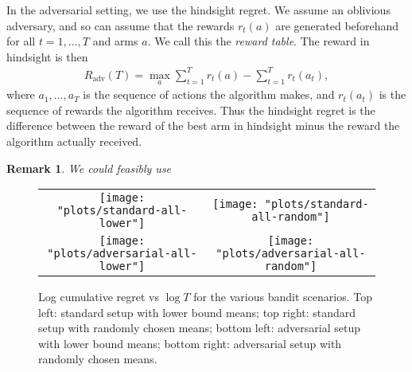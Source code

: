 \documentclass[10pt]{article}
\newtheorem{remark}{Remark}
\DeclareMathOperator{\adv}{adv}
\begin{document}
In the adversarial setting, we use the hindsight regret. We assume an oblivious
adversary, and so can assume that the rewards $r_t(a)$ are generated beforehand
for all $t = 1, \ldots, T$ and arms $a$. We call this the \emph{reward table}.
The reward in hindsight is then
\begin{align*}
    R_\adv(T) = \max_a \sum_{t=1}^T r_t(a) - \sum_{t=1}^T r_t(a_t),
\end{align*}
where $a_1, \ldots, a_T$ is the sequence of actions the algorithm makes, and
$r_t(a_t)$ is the sequence of rewards the algorithm receives. Thus the hindsight
regret is the difference between the reward of the best arm in hindsight minus
the reward the algorithm actually received.

\begin{remark}
    We could feasibly use 
\end{remark}

\begin{figure}[!ht]
    \center
    \begin{tabular}{cc}
        \texttt{[image: "plots/standard-all-lower"]} &
        \texttt{[image: "plots/standard-all-random"]} \\
        \texttt{[image: "plots/adversarial-all-lower"]} &
        \texttt{[image: "plots/adversarial-all-random"]} \\
    \end{tabular}
    \caption{Log cumulative regret vs $\log T$ for the various bandit scenarios.
    Top left: standard setup with lower bound means; top right: standard setup
    with randomly chosen means; bottom left: adversarial setup with lower bound
    means; bottom right: adversarial setup with randomly chosen means.}
    \label{figure-graphs}
\end{figure}



\end{document}
